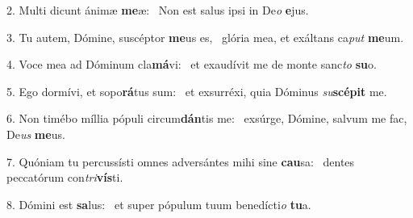 2. Multi dicunt ánimæ \textbf{me}æ: \ast\  Non est salus ipsi in De\textit{o} \textbf{e}jus.\

3. Tu autem, Dómine, suscéptor \textbf{me}us es, \ast\  glória mea, et exáltans ca\textit{put} \textbf{me}um.\

4. Voce mea ad Dóminum cla\textbf{má}vi: \ast\  et exaudívit me de monte sanc\textit{to} \textbf{su}o.\

5. Ego dormívi, et sopo\textbf{rá}tus sum: \ast\  et exsurréxi, quia Dóminus \textit{su}\textbf{scé}\textbf{pit} me.\

6. Non timébo míllia pópuli circum\textbf{dán}tis me: \ast\  exsúrge, Dómine, salvum me fac, De\textit{us} \textbf{me}us.\

7. Quóniam tu percussísti omnes adversántes mihi sine \textbf{cau}sa: \ast\  dentes peccatórum con\textit{tri}\textbf{vís}ti.\

8. Dómini est \textbf{sa}lus: \ast\  et super pópulum tuum benedícti\textit{o} \textbf{tu}a.\

